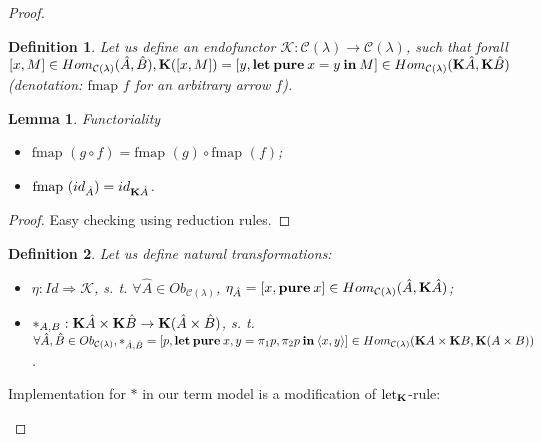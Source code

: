 \documentclass[a4paper]{article}
\newtheorem{lemma}{Lemma}
\newtheorem{defin}{Definition}
\begin{document}
\begin{proof}
\begin{defin}
  Let us define an endofunctor $\mathcal{K} : \mathcal{C}(\lambda) \to \mathcal{C}(\lambda)$, such that
forall $[x,M] \in Hom_{\mathcal{C}(\lambda)}(\hat{A},\hat{B}), {\bf K}([x,M]) = [y, {\bf let \: pure \:} x = y {\: \bf in \:} M] \in Hom_{\mathcal{C}(\lambda)}({\bf K} \hat{A}, {\bf K} \hat{B})$ (denotation: $\text{fmap } f$ for an arbitrary arrow $f$).

\end{defin}

\begin{lemma} Functoriality

\begin{itemize}
  \item $\text{fmap }(g \circ f) = \text{fmap }(g) \circ \text{fmap }(f)$;
  \item $\text{fmap }(id_{\hat{A}}) = id_{{\bf K}\hat{A}}$.
\end{itemize}
\end{lemma}

\begin{proof}

Easy checking using reduction rules.

\end{proof}

\begin{defin}

  Let us define natural transformations:

\begin{itemize}
  \item $\eta:Id \Rightarrow \mathcal{K}$, s. t. $\forall \hat{A} \in Ob_{\mathcal{C}(\lambda)}$, $\eta_{\hat{A}} = [x, {\bf pure \:} x] \in Hom_{\mathcal{C}(\lambda)}(\hat{A}, {\bf K}\hat{A})$;
  \item $\ast_{A,B}:{\bf K}\hat{A} \times {\bf K}\hat{B} \to {\bf K}(\hat{A} \times \hat{B})$, s. t. $\forall \hat{A}, \hat{B} \in Ob_{\mathcal{C}(\lambda)}, \ast_{\hat{A},\hat{B}} = [p, {\bf let \: pure \:} x,y = \pi_1 p, \pi_2 p {\: \bf in \:} \langle x, y \rangle] \in Hom_{\mathcal{C}(\lambda)}({\bf K}A \times {\bf K}B, {\bf K}(A \times B))$.
\end{itemize}
\end{defin}

Implementation for $\ast$ in our term model is a modification of ${\text{let}_{\bf K}}$-rule:

\begin{prooftree}
\end{prooftree}


\end{proof}
\end{document}
